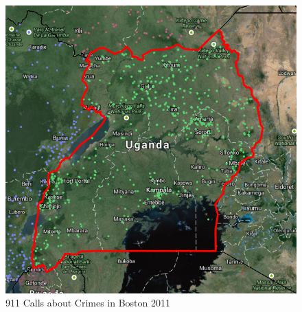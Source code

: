 \documentclass[a0,final]{a0poster}
\begin{document}
\begin{multicols}{3}
\begin{figure}[H]
\centering
\includegraphics[scale=0.6]{figs/uganda.png}
\caption{911 Calls about Crimes in Boston 2011}
\end{figure}

\columnbreak


\end{multicols}
\end{document}
